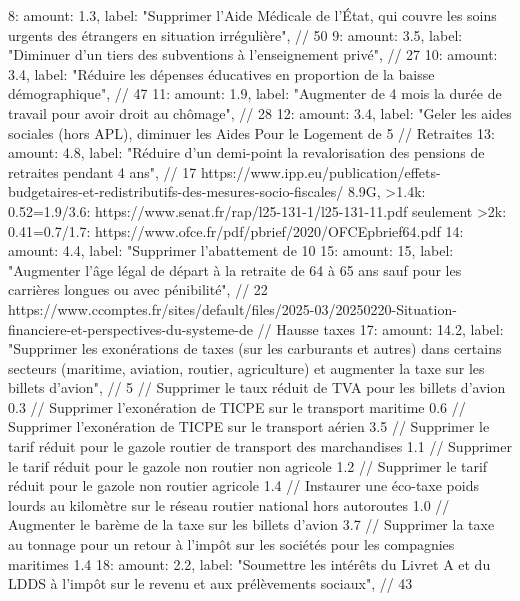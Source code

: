 {		8: { amount: 1.3,  label: "Supprimer l'Aide Médicale de l'État, qui couvre les soins urgents des étrangers en situation irrégulière"}, // 50
		9: { amount: 3.5,  label: "Diminuer d'un tiers des subventions à l'enseignement privé"}, // 27
		10: { amount: 3.4,  label: "Réduire les dépenses éducatives en proportion de la baisse démographique"}, // 47
		11: { amount: 1.9,  label: "Augmenter de 4 mois la durée de travail pour avoir droit au chômage"}, // 28
		12: { amount: 3.4,  label: "Geler les aides sociales (hors APL), diminuer les Aides Pour le Logement de 5%
		// Retraites
		13: { amount: 4.8,  label: "Réduire d'un demi-point la revalorisation des pensions de retraites pendant 4 ans"}, // 17 https://www.ipp.eu/publication/effets-budgetaires-et-redistributifs-des-mesures-socio-fiscales/ 8.9G, >1.4k: 0.52=1.9/3.6: https://www.senat.fr/rap/l25-131-1/l25-131-11.pdf seulement >2k: 0.41=0.7/1.7: https://www.ofce.fr/pdf/pbrief/2020/OFCEpbrief64.pdf
		14:  { amount: 4.4,    label: "Supprimer l'abattement de 10%
		15: { amount: 15, label: "Augmenter l'âge légal de départ à la retraite de 64 à 65 ans sauf pour les carrières longues ou avec pénibilité"}, // 22 https://www.ccomptes.fr/sites/default/files/2025-03/20250220-Situation-financiere-et-perspectives-du-systeme-de%
		// Hausse taxes
		17:  { amount: 14.2,  label: "Supprimer les exonérations de taxes (sur les carburants et autres) dans certains secteurs (maritime, aviation, routier, agriculture) et augmenter la taxe sur les billets d'avion"}, // 5
		// Supprimer le taux réduit de TVA pour les billets d'avion 0.3
		// Supprimer l'exonération de TICPE sur le transport maritime 0.6
		// Supprimer l'exonération de TICPE sur le transport aérien 3.5
		// Supprimer le tarif réduit pour le gazole routier de transport des marchandises 1.1
		// Supprimer le tarif réduit pour le gazole non routier non agricole 1.2
		// Supprimer le tarif réduit pour le gazole non routier agricole 1.4
		// Instaurer une éco-taxe poids lourds au kilomètre sur le réseau routier national hors autoroutes 1.0
		// Augmenter le barème de la taxe sur les billets d'avion 3.7
		// Supprimer la taxe au tonnage pour un retour à l'impôt sur les sociétés pour les compagnies maritimes 1.4
		18: { amount: 2.2,  label: "Soumettre les intérêts du Livret A et du LDDS à l'impôt sur le revenu et aux prélèvements sociaux"}, // 43
}}}
